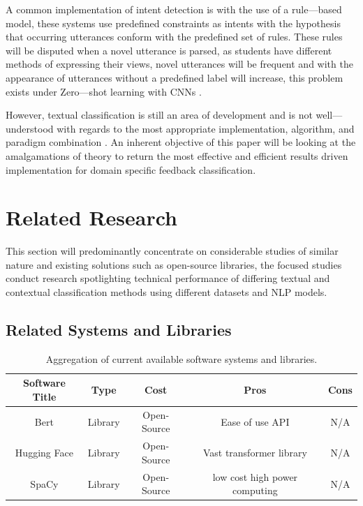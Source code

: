 A common implementation of intent detection is with the use of a rule---based model, these systems use predefined constraints as intents with the hypothesis that occurring utterances conform with the predefined set of rules. These rules will be disputed when a novel utterance is parsed, as students have different methods of expressing their views, novel utterances will be frequent and with the appearance of utterances without a predefined label will increase, this problem exists under Zero---shot learning with CNNs \parencite{xia2018zero}.

However, textual classification is still an area of development and is not well---understood with regards to the most appropriate implementation, algorithm, and paradigm combination \parencite{thangaraj2018text}. An inherent objective of this paper will be looking at the amalgamations of theory to return the most effective and efficient results driven implementation for domain specific feedback classification.

\section{Related Research}

This section will predominantly concentrate on considerable studies of similar nature and existing solutions such as open-source libraries, the focused studies conduct research spotlighting technical performance of differing textual and contextual classification methods using different datasets and NLP models.

\subsection{Related Systems and Libraries}

\begin{table}[H]
    \centering
    \begin{tabular}{|c c c c c|}
        \hline
        Software Title & Type    & Cost        & Pros       & Cons \\ [0.5ex]
        \hline
        Bert           & Library & Open-Source & Ease of use API    &  N/A\\
        \hline
        Hugging Face   & Library & Open-Source & Vast transformer library    &  N/A\\
        \hline
        SpaCy          & Library & Open-Source & low cost high power computing    &  N/A \\ [1ex]
        \hline
    \end{tabular}
   \caption{Aggregation of current available software systems and libraries.}
   \label{tab:C2RelatedSystems}
\end{table}

